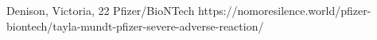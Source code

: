           {
            Denison, Victoria, 
          }
          {
            22
          }
          {
            Pfizer/BioNTech
          }
          {
          }
          {
          }
          {
            https://nomoresilence.world/pfizer-biontech/tayla-mundt-pfizer-severe-adverse-reaction/
          }

